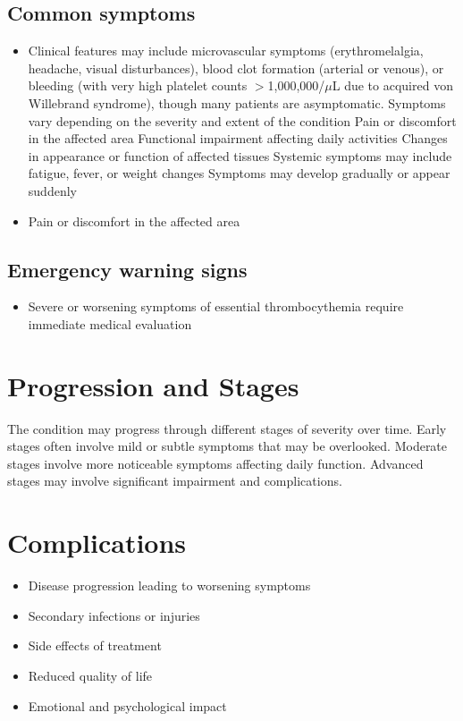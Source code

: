 \subsection{Common symptoms}
\begin{itemize}[noitemsep]
  \item Clinical features may include microvascular symptoms (erythromelalgia, headache, visual disturbances), blood clot formation (arterial or venous), or bleeding (with very high platelet counts $>$1,000,000/$\mu$L due to acquired von Willebrand syndrome), though many patients are asymptomatic. Symptoms vary depending on the severity and extent of the condition Pain or discomfort in the affected area Functional impairment affecting daily activities Changes in appearance or function of affected tissues Systemic symptoms may include fatigue, fever, or weight changes Symptoms may develop gradually or appear suddenly
  \item Pain or discomfort in the affected area
  \end{itemize}

\subsection{Emergency warning signs}
\begin{itemize}[noitemsep]
  \item Severe or worsening symptoms of essential thrombocythemia require immediate medical evaluation
\end{itemize}
\section{Progression and Stages}
The condition may progress through different stages of severity over time. Early stages often involve mild or subtle symptoms that may be overlooked. Moderate stages involve more noticeable symptoms affecting daily function. Advanced stages may involve significant impairment and complications.
\section{Complications}
\begin{itemize}[noitemsep]
  \item Disease progression leading to worsening symptoms
  \item Secondary infections or injuries
  \item Side effects of treatment
  \item Reduced quality of life
  \item Emotional and psychological impact
\end{itemize}
